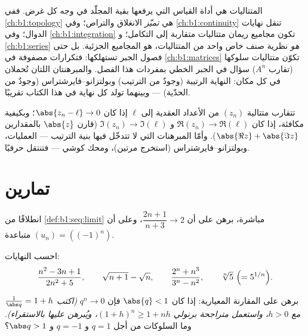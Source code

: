 \begin{remark}
المتتاليات هي أداة القياس التي يرفعها بقية المجلّد
في وجه كل غرض. ففي \cref{ch:b1:topology} هي
\emph{تميّز} الانغلاق والتراص؛ وفي
\cref{ch:b1:continuity} تنقل نهايات الدوال؛ وفي
\cref{ch:b1:integration} تكون مجاميع ريمان متتاليات متقاربة
إلى التكامل؛ و \cref{ch:b1:series} \emph{هو} نظرية صنف
خاص واحد من المتتاليات، هو المجاميع الجزئية. بل حتى فصول الجبر
تستهلكها: فتكرارات مصفوفة في
\cref{ch:b1:matrices} تكوّن متتاليات سلوكها
(تقارب $A^n$) سؤال في الجبر الخطي بمفردات هذا
الفصل. والمبرهنتان اللتان تُحملان في كل مكان:
النهاية الرتيبة (وجودٌ من الترتيب) وبولتزانو--فايرشتراس
(وجودٌ من الحدّية) --- وبينهما تولد كل نهاية
في هذا الكتاب تقريبًا.
\end{remark}

\begin{remark}
تتقارب متتالية $(z_n)$ من الأعداد العقدية إلى $\ell$ إذا كان
$\abs{z_n - \ell} \to 0$؛ وبكيفية مكافئة، إذا كان $\Re(z_n) \to \Re(\ell)$
و $\Im(z_n) \to \Im(\ell)$ (قارن $\abs{z}$ بالمقدارين $\abs{\Re z} +
\abs{\Im z}$). وأمّا المبرهنات التي لا تتدخّل فيها بنية الترتيب --- العمليات،
وبولتزانو--فايرشتراس (استخرج مرتين)، ومحك كوشي --- فتنتقل
حرفيًا.
\end{remark}

\section{تمارين}

\begin{exercise}[$\star$]\label{exo:b1:seq:1}
انطلاقًا من \cref{def:b1:seq:limit} مباشرة، برهن على أن
$\dfrac{2n+1}{n+3} \to 2$، وعلى أن $(u_n) = ((-1)^n)$ متباعدة.
\end{exercise}

\begin{exercise}[$\star$]\label{exo:b1:seq:2}
احسب النهايات:
\[
\frac{n^2 - 3n + 1}{2n^2 + 5},
\qquad
\sqrt{n+1} - \sqrt n,
\qquad
\frac{2^n + n^3}{3^n - n^2},
\qquad
\sqrt[n]{5}\ \Bigl(= 5^{1/n}\Bigr).
\]
\end{exercise}

\begin{exercise}[$\star$]\label{exo:b1:seq:3}
برهن على المقارنة المعيارية: إذا كان $\abs{q} < 1$ فإن $q^n \to 0$
\emph{(اكتب $\frac{1}{\abs q} = 1 + h$ مع $h > 0$، واستعمل
متراجحة برنولي $(1+h)^n \geq 1 + nh$، ويُبرهن عليها
بالاستقراء)}. وما السلوكات من أجل $q = 1$ و $q = -1$ و $\abs q >
1$؟
\end{exercise}

